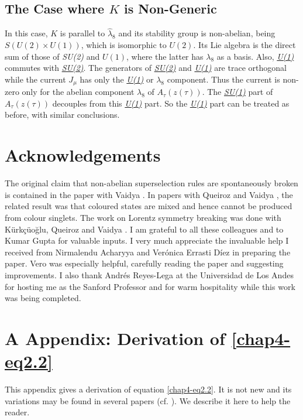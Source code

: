 \subsection{The Case where $K$ is Non-Generic}\label{chap4-sec4.1}

In this case, $K$ is parallel to $\hat{\lambda}_8$ and its stability group is non-abelian, being $S(U(2) \times U(1))$, which is isomorphic to $U(2)$. Its Lie algebra is the direct sum of those of \textit{SU(2)} and $U(1)$, where the latter has $\lambda_8$ as a basis. Also, \ul{\textit{U(1)}} commutes with \ul{\textit{SU(2)}}. The generators of \ul{\textit{SU(2)}} and \ul{\textit{U(1)}} are trace orthogonal while the current $J_\mu$ has only the \ul{\textit{U(1)}} or $\lambda_8$ component. Thus the current is non-zero only for the abelian component $\lambda_8$ of $A_\tau(z (\tau))$. The \ul{\textit{SU(1)}} part of $A_\tau (z(\tau))$ decouples from this \ul{\textit{U(1)}} part. So the \ul{\textit{U(1)}} part can be treated as before, with similar conclusions.

\section*{Acknowledgements}

The original claim that non-abelian superselection rules are spontaneously broken is contained in the paper with Vaidya \cite{chap4-key1}. In papers with Queiroz and Vaidya \cite{chap4-key10, chap4-key13}, the related result was that coloured states are mixed and hence cannot be produced from colour singlets. The work on Lorentz symmetry breaking was done with K\"urk\c{c}\"{u}o\u{g}lu, Queiroz and Vaidya \cite{chap4-key4}. I am grateful to all these colleagues and to Kumar Gupta for valuable inputs. I very much appreciate the invaluable help I received from Nirmalendu Acharyya and Ver\'onica Errasti D\'iez in preparing the paper. Vero was especially helpful, carefully reading the paper and suggesting improvements. I also thank Andr\'es Reyes-Lega at the Universidad de Los Andes for hosting me as the Sanford Professor and for warm hospitality while this work was being completed.


\section*{A Appendix: Derivation of \eqref{chap4-eq2.2}}

This appendix gives a derivation of equation \eqref{chap4-eq2.2}. It is not new and its variations may be found in several papers (cf. \cite{chap4-key3, chap4-key6, chap4-key14}). We describe it here to help the reader.

